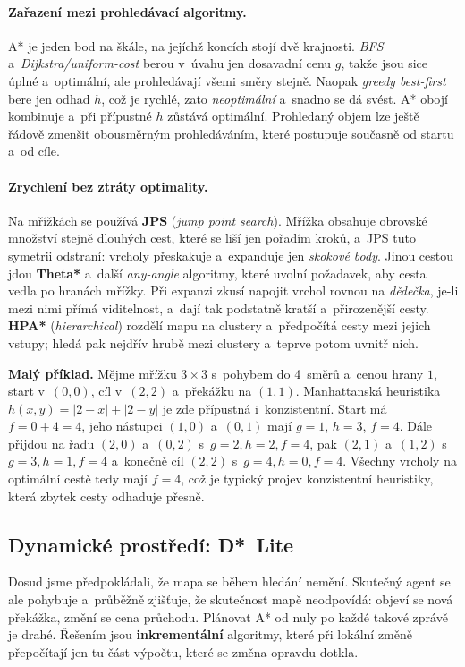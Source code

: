 \documentclass[11pt,a4paper]{article}
\theoremstyle{definition}
\begin{document}
\paragraph{Zařazení mezi prohledávací algoritmy.} A* je jeden bod na škále, na jejíchž koncích
stojí dvě krajnosti. \emph{BFS} a~\emph{Dijkstra/uniform-cost} berou v~úvahu jen dosavadní cenu
$g$, takže jsou sice úplné a~optimální, ale prohledávají všemi směry stejně. Naopak
\emph{greedy best-first} bere jen odhad $h$, což je rychlé, zato \emph{neoptimální} a~snadno se
dá svést. A* obojí kombinuje a~při přípustné $h$ zůstává optimální. Prohledaný objem lze ještě
řádově zmenšit obousměrným prohledáváním, které postupuje současně od startu a~od cíle.

\paragraph{Zrychlení bez ztráty optimality.} Na mřížkách se používá \textbf{JPS}
(\emph{jump point search}). Mřížka obsahuje obrovské množství stejně dlouhých cest, které se
liší jen pořadím kroků, a~JPS tuto symetrii odstraní:  vrcholy přeskakuje
a~expanduje jen \emph{skokové body}. Jinou cestou jdou \textbf{Theta*} a~další \emph{any-angle}
algoritmy, které uvolní požadavek, aby cesta vedla po hranách mřížky. Při expanzi zkusí napojit
vrchol rovnou na \emph{dědečka}, je-li mezi nimi přímá viditelnost, a~dají tak podstatně kratší
a~přirozenější cesty. \textbf{HPA*} (\emph{hierarchical}) rozdělí mapu na clustery a~předpočítá
cesty mezi jejich vstupy; hledá pak nejdřív hrubě mezi clustery a~teprve potom uvnitř nich.

\medskip
\noindent\textbf{Malý příklad.} Mějme mřížku $3\times3$ s~pohybem do 4~směrů a~cenou hrany $1$,
start v~$(0,0)$, cíl v~$(2,2)$ a~překážku na $(1,1)$. Manhattanská heuristika
$h(x,y) = |2-x| + |2-y|$ je zde přípustná i~konzistentní. Start má $f=0+4=4$, jeho nástupci
$(1,0)$ a~$(0,1)$ mají $g=1$, $h=3$, $f=4$. Dále přijdou na řadu $(2,0)$ a~$(0,2)$
s~$g=2,h=2,f=4$, pak $(2,1)$ a~$(1,2)$ s~$g=3,h=1,f=4$ a~konečně cíl $(2,2)$ s~$g=4,h=0,f=4$.
Všechny vrcholy na optimální cestě tedy mají $f=4$, což je typický projev konzistentní
heuristiky, která zbytek cesty odhaduje přesně.

\subsection{Dynamické prostředí: D*~Lite}

Dosud jsme předpokládali, že mapa se během hledání nemění. Skutečný agent se ale pohybuje
a~průběžně zjišťuje, že skutečnost mapě neodpovídá: objeví se nová překážka, změní se cena
průchodu. Plánovat A* od nuly po každé takové zprávě je drahé. Řešením jsou \textbf{inkrementální}
algoritmy, které při lokální změně přepočítají jen tu část výpočtu, které se změna opravdu
dotkla.
\end{document}
